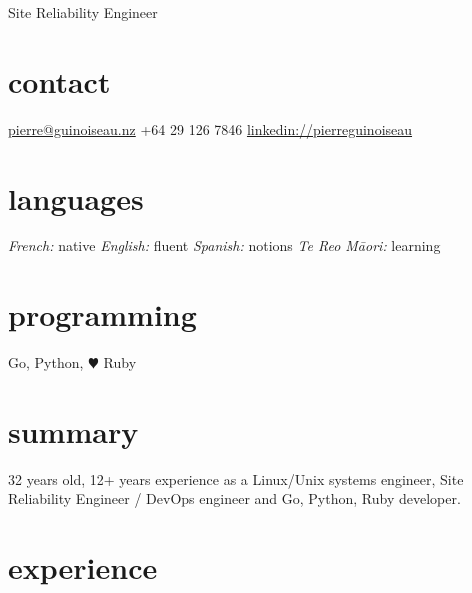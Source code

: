 \documentclass[]{friggeri-cv}
\begin{document}

       {Site Reliability Engineer}



\begin{aside}
  \section{contact}
    \href{mailto:pierre@guinoiseau.nz}{pierre@guinoiseau.nz}
    +64 29 126 7846
    \href{https://linkedin.com/in/pierreguinoiseau}{linkedin://pierreguinoiseau}
  \section{languages}
    \textit{French:} native
    \textit{English:} fluent
    \textit{Spanish:} notions
    \textit{Te Reo Māori:} learning
  \section{programming}
    Go, Python, {\color{red} $\varheartsuit$} Ruby
\end{aside}



\section{summary}

32 years old, 12+ years experience as a Linux/Unix systems engineer, Site
Reliability Engineer / DevOps engineer and Go, Python, Ruby developer.



\section{experience}
\end{document}
